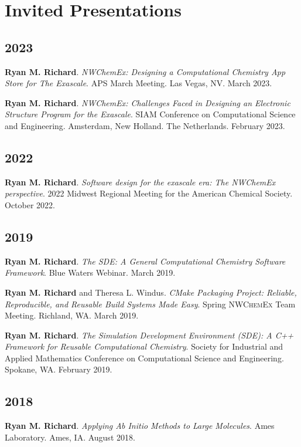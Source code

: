 \documentclass[11pt,a4paper,sans]{moderncv}
\begin{document}
\section{Invited Presentations}
\vspace{5pt}
\begin{etaremune}
    \item[]{}
	\subsection{2023}
	\item{\textbf{Ryan M. Richard}. \textit{NWChemEx: Designing a Computational
	      Chemistry App Store for The Exascale}. APS March Meeting. Las Vegas,
		  NV. March 2023.}
	\item{\textbf{Ryan M. Richard}. \textit{NWChemEx: Challenges Faced in
	      Designing an Electronic Structure Program for the Exascale}. SIAM
		  Conference on Computational Science and Engineering. Amsterdam, New
		  Holland. The Netherlands. February 2023.}

	\subsection{2022}
    \item{\textbf{Ryan M. Richard}. \textit{Software design for the exascale
	      era: The NWChemEx perspective}. 2022 Midwest Regional Meeting for the
		  American Chemical Society. October 2022.}

	\subsection{2019}
	\item{\textbf{Ryan M. Richard}. \textit{The SDE: A General Computational
	      Chemistry Software Framework}. Blue Waters Webinar. March 2019.}
	\item{\textbf{Ryan M. Richard} and Theresa L. Windus. \textit{CMake
	      Packaging Project: Reliable, Reproducible, and Reusable Build Systems
		  Made Easy}. Spring \textsc{NWChemEx} Team Meeting. Richland, WA.
		  March 2019.}
	\item{\textbf{Ryan M. Richard}. \textit{The Simulation Development
	      Environment (SDE): A C++ Framework for Reusable Computational
		  Chemistry}. Society for Industrial and Applied Mathematics Conference
		  on Computational Science and Engineering. Spokane, WA. February 2019.}

	\subsection{2018}
	\item{\textbf{Ryan M. Richard}. \textit{Applying Ab Initio Methods to
	      Large Molecules}. Ames Laboratory.  Ames, IA. August 2018.}


\end{etaremune}
\end{document}

